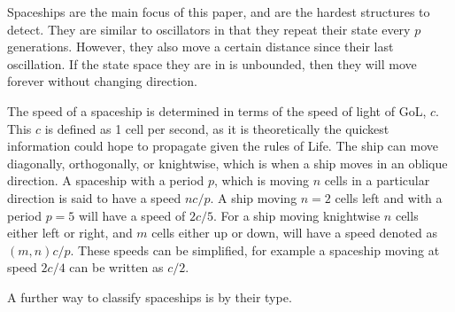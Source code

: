 \documentclass{l4proj}
\begin{document}
Spaceships are the main focus of this paper, and are the hardest structures to detect. They are similar to oscillators in that they repeat their state every $p$ generations. However, they also move a certain distance since their last oscillation. If the state space they are in is unbounded, then they will move forever without changing direction.

The speed of a spaceship is determined in terms of the speed of light of GoL, $c$. This $c$ is defined as 1 cell per second, as it is theoretically the quickest information could hope to propagate given the rules of Life. The ship can move diagonally, orthogonally, or knightwise, which is when a ship moves in an oblique direction. A spaceship with a period $p$, which is moving $n$ cells in a particular direction is said to have a speed $nc/p$. A ship moving $n = 2$ cells left and with a period $p = 5$ will have a speed of $2c/5$. For a ship moving knightwise $n$ cells either left or right, and $m$ cells either up or down, will have a speed denoted as $(m, n)c/p$. These speeds can be simplified, for example a spaceship moving at speed $2c/4$ can be written as $c/2$.

A further way to classify spaceships is by their type. 
\end{document}
